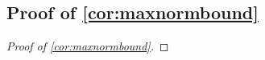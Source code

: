 \documentclass[10pt]{article}
\newcommand{\0}{{\mathbf{0}}}
\newcommand{\1}{{\mathbf{1}}}
\newcommand{\U}{{\mathbf{U}}}
\renewcommand{\t}{^{\top}}
\newcommand{\uhat}{\mathbf{\hat{U}}}
\renewcommand{\hat}{\widehat}
\renewcommand{\hat}{\widehat}
\begin{document}
\subsection{Proof of \cref{cor:maxnormbound}} \label{sec:maxnormproof}
\begin{proof}[Proof of \cref{cor:maxnormbound}]

\end{proof}
\end{document}
